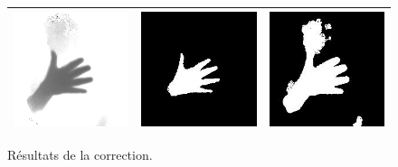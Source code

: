 \begin{figure}
\begin{tabular}{|c|c|c|}
\includegraphics[scale=0.4]{correcSrc3.png} & \includegraphics[scale=0.4]{correcOut1-3.jpg} & \includegraphics[scale=0.4]{correcOut2-3.jpg} \\
\hline
\end{tabular}
\caption{Résultats de la correction.}
\end{figure}

